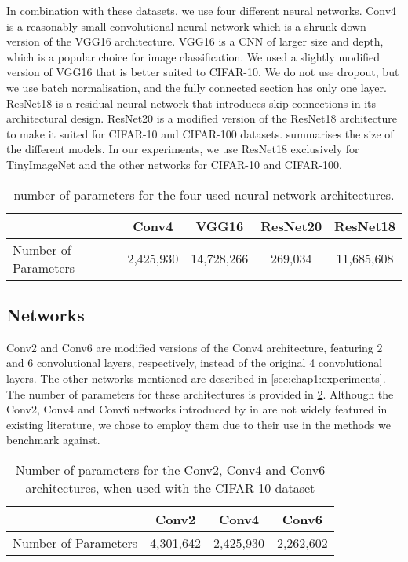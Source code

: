 In combination with these datasets, we use four different neural networks. Conv4
is a reasonably small convolutional neural network which is a
shrunk-down version of the VGG16 architecture. VGG16 is a \acl{CNN}
of larger size and depth, which is a popular choice for image classification. We
used a slightly modified version of VGG16 that is better suited to CIFAR-10. We
do not use dropout, but we use batch normalisation, and the fully connected
section has only one layer. ResNet18 is a residual neural network that
introduces skip connections in its architectural design. ResNet20 is a modified
version of the ResNet18 architecture to make it suited for CIFAR-10 and CIFAR-100
datasets.  summarises the size of the different
models. In our experiments, we use ResNet18 exclusively for TinyImageNet and the
other networks for CIFAR-10 and CIFAR-100.\\


\begin{table}[ht]
  \centering
  \begin{tabular}{lcccc}
    \cline{2-5}
                         & \textbf{Conv4} & \textbf{VGG16} & \textbf{ResNet20} & \textbf{ResNet18} \\ \hline
    Number of Parameters & 2,425,930      & 14,728,266     & 269,034           & 11,685,608        \\ \hline
  \end{tabular}
  \caption{ number of parameters for the four used neural network architectures.}
  \label{tab:intro:networks_size}
\end{table}

\subsection{Networks}

Conv2 and Conv6 are modified versions of the Conv4 architecture, featuring 2 and
6 convolutional layers, respectively, instead of the original 4 convolutional
layers. The other networks mentioned are described in
\cref{sec:chap1:experiments}. The number of parameters for these architectures
is provided in \cref{tab:chap2:conv_num_params}. Although the Conv2, Conv4 and
Conv6 networks introduced by \citeauthor{DBLP:conf/iclr/FrankleC19} in
\cite{DBLP:conf/iclr/FrankleC19} are not widely featured in existing literature,
we chose to employ them due to their use in the methods we benchmark against.

\begin{table}[htbp]
    \centering\begin{tabular}{lccc}
      \cmidrule[\heavyrulewidth]{2-4}
                           & \textbf{Conv2} & \textbf{Conv4} & \textbf{Conv6} \\ \toprule
      Number of Parameters & 4,301,642      & 2,425,930      & 2,262,602      \\ \bottomrule
    \end{tabular}
    \caption{Number of parameters for the Conv2, Conv4 and Conv6 architectures, when used with the CIFAR-10 dataset}
    \label{tab:chap2:conv_num_params}
  \end{table}